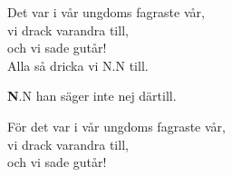 \vspace{10pt}
Det var i vår ungdoms fagraste vår,\\
vi drack varandra till,\\
och vi sade gutår!\\
Alla så dricka vi N.N till.\par
\vspace{10pt}
{\textbf N.N han säger inte nej därtill.}\par
\vspace{10pt}
För det var i vår ungdoms fagraste vår,\\
vi drack varandra till,\\
och vi sade gutår! 
